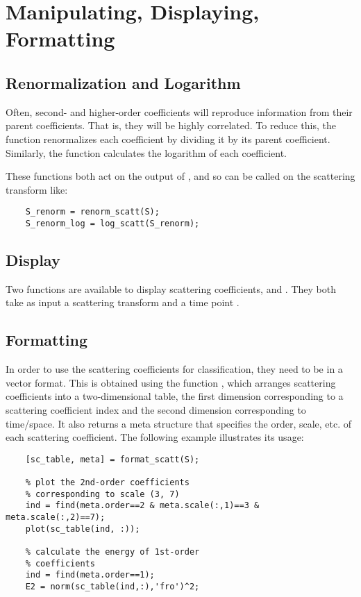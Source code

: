 \documentclass[twocolumn]{article}
\begin{document}
\section{Manipulating, Displaying, Formatting}

\subsection{Renormalization and Logarithm}
Often, second- and higher-order coefficients will reproduce information from their parent coefficients. That is, they will be highly correlated. To reduce this, the  function renormalizes each coefficient by dividing it by its parent coefficient. Similarly, the  function calculates the logarithm of each coefficient.

These functions both act on the output of , and so can be called on the scattering transform  like:
\begin{lstlisting}
	S_renorm = renorm_scatt(S);
	S_renorm_log = log_scatt(S_renorm);
\end{lstlisting}

\subsection{Display}
Two functions are available to display scattering coefficients,  and . They both take as input a scattering transform  and a time point .

\subsection{Formatting}
In order to use the scattering coefficients for classification, they need to be in a vector format. This is obtained using the function , which arranges scattering coefficients into a two-dimensional table, the first dimension corresponding to a scattering coefficient index and the second dimension corresponding to time/space. It also returns a meta structure that specifies the order, scale, etc. of each scattering coefficient. The following example illustrates its usage:
\begin{lstlisting}
	[sc_table, meta] = format_scatt(S);
	
	% plot the 2nd-order coefficients
	% corresponding to scale (3, 7)
	ind = find(meta.order==2 & meta.scale(:,1)==3 & meta.scale(:,2)==7);
	plot(sc_table(ind, :));
	
	% calculate the energy of 1st-order
	% coefficients
	ind = find(meta.order==1);
	E2 = norm(sc_table(ind,:),'fro')^2;
\end{lstlisting}
\end{document}
